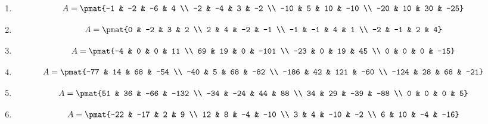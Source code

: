 \begin{enumerate}
\item

\begin{align*}
A = \pmat{-1 & -2 & -6 & 4 \\ -2 & -4 & 3 & -2 \\ -10 & 5 & 10 & -10 \\ -20 & 10 & 30 & -25}
\end{align*}

\item

\begin{align*}
A = \pmat{0 & -2 & 3 & 2 \\ 2 & 4 & -2 & -1 \\ -1 & -1 & 4 & 1 \\ -2 & -1 & 2 & 4}
\end{align*}

\item

\begin{align*}
A = \pmat{-4 & 0 & 0 & 11 \\ 69 & 19 & 0 & -101 \\ -23 & 0 & 19 & 45 \\ 0 & 0 & 0 & -15}
\end{align*}

\item

\begin{align*}
A = \pmat{-77 & 14 & 68 & -54 \\ -40 & 5 & 68 & -82 \\ -186 & 42 & 121 & -60 \\ -124 & 28 & 68 & -21}
\end{align*}

\item

\begin{align*}
A = \pmat{51 & 36 & -66 & -132 \\ -34 & -24 & 44 & 88 \\ 34 & 29 & -39 & -88 \\ 0 & 0 & 0 & 5}
\end{align*}

\item

\begin{align*}
A = \pmat{-22 & -17 & 2 & 9 \\ 12 & 8 & -4 & -10 \\ 3 & 4 & -10 & -2 \\ 6 & 10 & -4 & -16}
\end{align*}


\end{enumerate}
